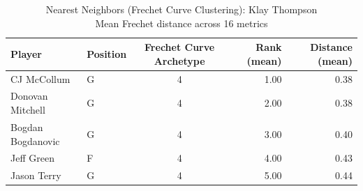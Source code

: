 \begin{table}[t]
\caption*{
{\fontsize{20}{25} Nearest Neighbors (Frechet Curve Clustering): Klay Thompson\fontsize{12}{15}\selectfont } \\ 
{\fontsize{14}{17}\selectfont  Mean Frechet distance across 16 metrics\fontsize{12}{15}\selectfont }
} 
\fontsize{12.0pt}{14.0pt}\selectfont
\begin{tabular*}{\linewidth}{@{\extracolsep{\fill}}llcrr}
\toprule
Player & Position & Frechet Curve Archetype & Rank (mean) & Distance (mean) \\ 
\midrule\addlinespace[2.5pt]
CJ McCollum & G & 4 & 1.00 & 0.38 \\ 
Donovan Mitchell & G & 4 & 2.00 & 0.38 \\ 
Bogdan Bogdanovic & G & 4 & 3.00 & 0.40 \\ 
Jeff Green & F & 4 & 4.00 & 0.43 \\ 
Jason Terry & G & 4 & 5.00 & 0.44 \\ 
\bottomrule
\end{tabular*}
\end{table}

